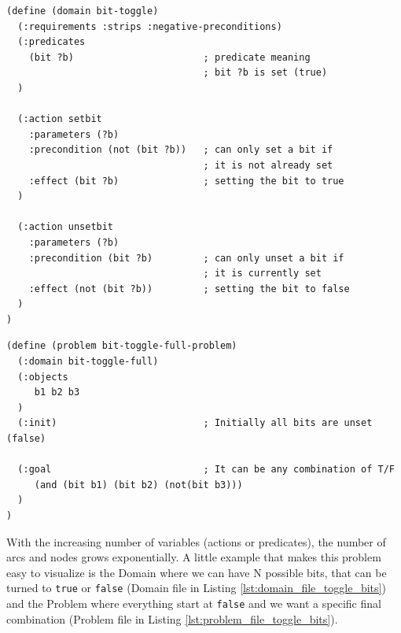 \vspace{10mm}
\begin{codewindow}
    \begin{lstlisting}
(define (domain bit-toggle)
  (:requirements :strips :negative-preconditions)
  (:predicates
    (bit ?b)                       ; predicate meaning
                                   ; bit ?b is set (true)
  )

  (:action setbit
    :parameters (?b)
    :precondition (not (bit ?b))   ; can only set a bit if
                                   ; it is not already set
    :effect (bit ?b)               ; setting the bit to true
  )

  (:action unsetbit
    :parameters (?b)
    :precondition (bit ?b)         ; can only unset a bit if
                                   ; it is currently set
    :effect (not (bit ?b))         ; setting the bit to false
  )
)

\end{lstlisting}
\end{codewindow}
\vspace{10mm}

\vspace{10mm}
\begin{codewindow}
    \begin{lstlisting}
(define (problem bit-toggle-full-problem)
  (:domain bit-toggle-full)
  (:objects
     b1 b2 b3
  )
  (:init)                          ; Initially all bits are unset (false)

  (:goal                           ; It can be any combination of T/F
     (and (bit b1) (bit b2) (not(bit b3)))
  )
)
\end{lstlisting}
\end{codewindow}
\vspace{10mm}

With the increasing number of variables (actions or predicates), the number of arcs
and nodes grows exponentially. A little example that makes this problem easy to
visualize is the Domain where we can have N possible bits, that can be turned to
\texttt{true} or \texttt{false} (Domain file in Listing
\ref{lst:domain_file_toggle_bits}) and the Problem where everything start at \texttt{false}
and we want a specific final combination (Problem file in Listing \ref{lst:problem_file_toggle_bits}).

